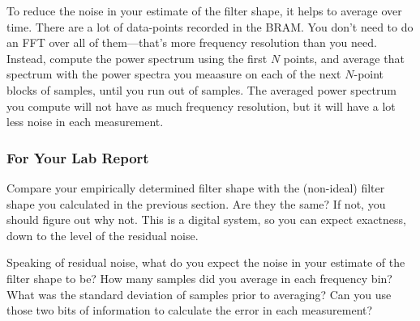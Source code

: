 \documentclass[11pt]{article}
\begin{document}
To reduce the noise in your estimate of the filter shape, it helps to average over time.  There are a lot of data-points recorded
in the BRAM.  You don't need to do an FFT over all of them---that's more frequency resolution than you need.  Instead, compute
the power spectrum using the first $N$ points, and average that spectrum with the power spectra you meaasure on each of the next
$N$-point blocks of samples, until you run out of samples.  The averaged power spectrum you compute will not have as much
frequency resolution, but it will have a lot less noise in each measurement.

\subsubsection{For Your Lab Report}

Compare your empirically determined filter shape with the (non-ideal) filter shape you calculated in the previous section.
Are they the same?  If not, you should figure out why not.  This is a digital system, so you can expect exactness, down to the
level of the residual noise.

Speaking of residual noise, what do you expect the noise in your estimate of the filter shape to be?  How many samples did you
average in each frequency bin?  What was the standard deviation of samples prior to averaging?  Can you use those two bits
of information to calculate the error in each measurement?
\end{document}
